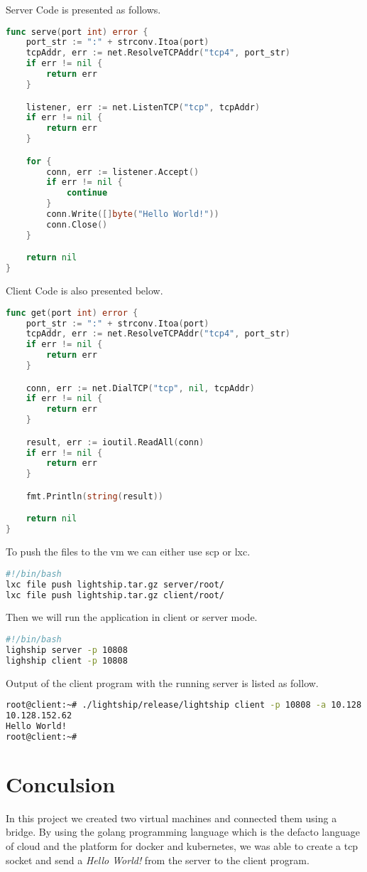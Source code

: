 \documentclass[a4paper, 11pt]{article}
\theoremstyle{nonumberplain}
\begin{document}
\pagebreak
Server Code is presented as follows.

\begin{lstlisting}[language=go]
func serve(port int) error {
	port_str := ":" + strconv.Itoa(port)
	tcpAddr, err := net.ResolveTCPAddr("tcp4", port_str)
	if err != nil {
		return err
	}

	listener, err := net.ListenTCP("tcp", tcpAddr)
	if err != nil {
		return err
	}

	for {
		conn, err := listener.Accept()
		if err != nil {
			continue
		}
		conn.Write([]byte("Hello World!"))
		conn.Close()
	}

	return nil
}
\end{lstlisting}

Client Code is also presented below.

\begin{lstlisting}[language=go]
func get(port int) error {
	port_str := ":" + strconv.Itoa(port)
	tcpAddr, err := net.ResolveTCPAddr("tcp4", port_str)
	if err != nil {
		return err
	}

	conn, err := net.DialTCP("tcp", nil, tcpAddr)
	if err != nil {
		return err
	}

	result, err := ioutil.ReadAll(conn)
	if err != nil {
		return err
	}

	fmt.Println(string(result))

	return nil
}

\end{lstlisting}

To push the files to the vm we can either use scp or lxc.
\begin{lstlisting}[language=bash]
#!/bin/bash
lxc file push lightship.tar.gz server/root/
lxc file push lightship.tar.gz client/root/
\end{lstlisting}

Then we will run the application in client or server mode.

\begin{lstlisting}[language=bash]
#!/bin/bash
lighship server -p 10808
lighship client -p 10808
\end{lstlisting}

Output of the client program with the running server is listed as follow.

\begin{lstlisting}[language=bash]
root@client:~# ./lightship/release/lightship client -p 10808 -a 10.128.152.62
10.128.152.62
Hello World!
root@client:~#
\end{lstlisting}

\section{Conculsion}
In this project we created two virtual machines and connected them using a
bridge. By using the golang programming language which is the defacto language
of cloud and the platform for docker and kubernetes, we was able to create a
tcp socket and send a \textit{Hello World!} from the server to the client
program.



% 
\end{document}
